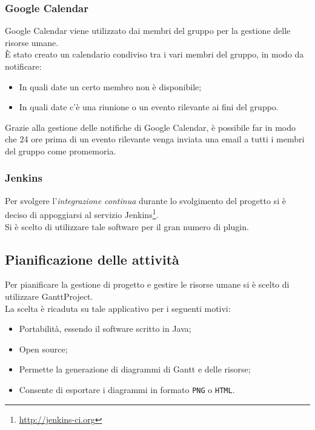\subsubsection{Google Calendar}
\label{calendar}
Google Calendar\glossario{} viene utilizzato dai membri del gruppo per la gestione delle risorse umane.
\\È stato creato un calendario condiviso tra i vari membri del gruppo, in modo da notificare:
\begin{itemize}
\item In quali date un certo membro non è disponibile;
\item In quali date c'è una riunione o un evento rilevante ai fini del gruppo.
\end{itemize}
Grazie alla gestione delle notifiche di Google Calendar\glossario{}, è possibile far in modo che 24 ore prima di un evento rilevante venga inviata una email a tutti i membri del gruppo come promemoria.

\subsubsection{Jenkins}
\label{jenkins}
Per svolgere l'\emph{integrazione continua} durante lo svolgimento del progetto si è deciso di appoggiarsi al servizio Jenkins\footnote{\url{http://jenkins-ci.org}}.
\\Si è scelto di utilizzare tale software per il gran numero di plugin.

\subsection{Pianificazione delle attività}
\label{pianificazione}
Per pianificare la gestione di progetto e gestire le risorse umane si è scelto di utilizzare GanttProject\glossario{}.
\\La scelta è ricaduta su tale applicativo per i seguenti motivi:
\begin{itemize}
	\item Portabilità, essendo il software scritto in Java;
	\item Open source;
	\item Permette la generazione di diagrammi di Gantt\glossario{} e delle risorse;
	\item Consente di esportare i diagrammi in formato \verb!PNG! o \verb!HTML!.
\end{itemize}

